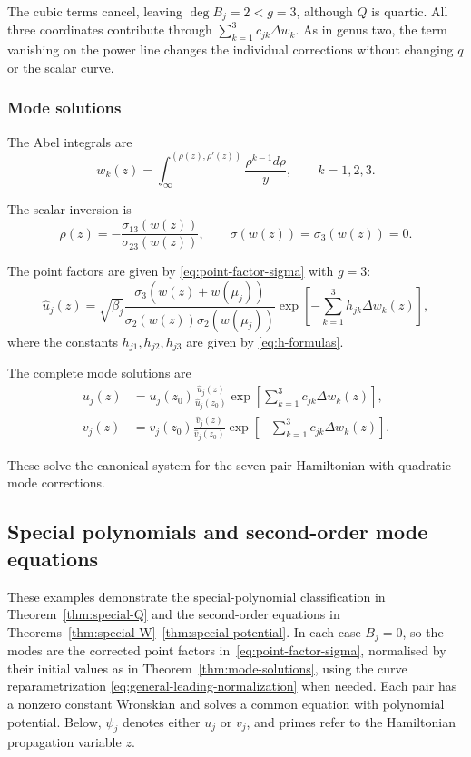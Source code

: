 \documentclass[11pt]{article}
\begin{document}
The cubic terms cancel, leaving $\deg B_j=2<g=3$, although $Q$ is quartic. All three coordinates contribute through $\sum_{k=1}^3c_{jk}\Delta w_k$. As in genus two, the term vanishing on the power line changes the individual corrections without changing $q$ or the scalar curve.
\FloatBarrier

\subsubsection{Mode solutions}

The Abel integrals are
\[
w_k(z) = \int_\infty^{(\rho(z),\rho'(z))}\frac{\rho^{k-1}d\rho}{y}, \qquad k=1,2,3.
\]

The scalar inversion is
\[
\rho(z) = -\frac{\sigma_{13}(w(z))}{\sigma_{23}(w(z))}, \qquad \sigma(w(z)) = \sigma_3(w(z)) = 0.
\]

The point factors are given by \eqref{eq:point-factor-sigma} with $g=3$:
\[
\widehat{u}_j(z) = \sqrt{\beta_j}\frac{\sigma_3(w(z)+w(\mu_j))}{\sigma_2(w(z))\sigma_2(w(\mu_j))}\exp\!\left[-\sum_{k=1}^3 h_{jk}\Delta w_k(z)\right],
\]
where the constants $h_{j1}, h_{j2}, h_{j3}$ are given by \eqref{eq:h-formulas}.

The complete mode solutions are
\begin{equation}\label{ex:g3-modes}
\begin{aligned}
u_j(z) &= u_j(z_0)\frac{\widehat{u}_j(z)}{\widehat{u}_j(z_0)}\exp\!\left[\sum_{k=1}^3 c_{jk}\Delta w_k(z)\right],\\
v_j(z) &= v_j(z_0)\frac{\widehat{v}_j(z)}{\widehat{v}_j(z_0)}\exp\!\left[-\sum_{k=1}^3 c_{jk}\Delta w_k(z)\right].
\end{aligned}
\end{equation}

These solve the canonical system for the seven-pair Hamiltonian with quadratic mode corrections.

\subsection{Special polynomials and second-order mode equations}\label{sec:special-examples}

These examples demonstrate the special-polynomial classification in
Theorem~\ref{thm:special-Q} and the second-order equations in
Theorems~\ref{thm:special-W}--\ref{thm:special-potential}.
In each case $B_j=0$, so the modes are the corrected point factors
in~\eqref{eq:point-factor-sigma}, normalised by their initial values
as in Theorem~\ref{thm:mode-solutions}, using the curve reparametrization
\eqref{eq:general-leading-normalization} when needed.
Each pair has a nonzero constant Wronskian and solves a common equation
with polynomial potential. Below, $\psi_j$ denotes either $u_j$ or $v_j$,
and primes refer to the Hamiltonian propagation variable $z$.
\end{document}
